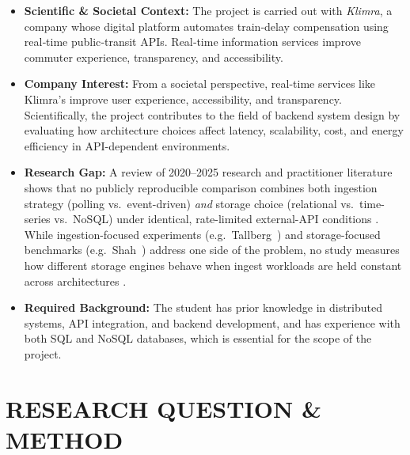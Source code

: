 \documentclass[11pt]{article}
\begin{document}
\begin{itemize}[leftmargin=*, label={}]
  \item %
    \textbf{Scientific \& Societal Context:} The project is carried out with \emph{Klimra}, a company whose digital platform automates train‑delay compensation using real‑time public‑transit APIs. Real‑time information services improve commuter experience, transparency, and accessibility.
  
  \item %
    \textbf{Company Interest:} From a societal perspective, real-time services like Klimra’s improve user experience, accessibility, and transparency. Scientifically, the project contributes to the field of backend system design by evaluating how architecture choices affect latency, scalability, cost, and energy efficiency in API-dependent environments.
  
  \item %
    \textbf{Research Gap:} A review of 2020--2025 research and practitioner literature shows that no publicly reproducible comparison combines both ingestion strategy (polling vs.\ event-driven) \emph{and} storage choice (relational vs.\ time-series vs.\ NoSQL) under identical, rate-limited external-API conditions \cite{Laigner2024Microservices,Shah2022TimeSeriesDB,Tallberg2020IngestOnly}.  While ingestion-focused experiments (e.g.\ Tallberg~\cite{Tallberg2020IngestOnly}) and storage-focused benchmarks (e.g.\ Shah~\cite{Shah2022TimeSeriesDB}) address one side of the problem, no study measures how different storage engines behave when ingest workloads are held constant across architectures \cite{Marcu2022PushPull,AWSTimestreamRDSMigrate2023}.

  \item %
    \textbf{Required Background:} The student has prior knowledge in distributed systems, API integration, and backend development, and has experience with both SQL and NoSQL databases, which is essential for the scope of the project.
\end{itemize}

\section*{RESEARCH QUESTION \& METHOD}
\end{document}
